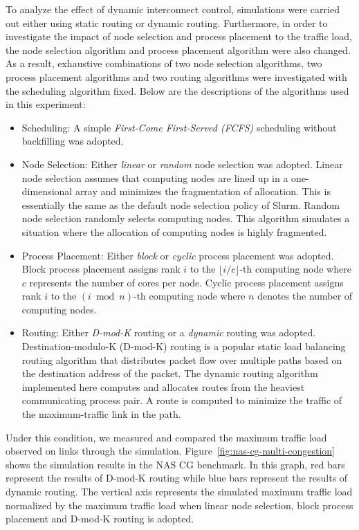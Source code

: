 To analyze the effect of dynamic interconnect control, simulations were
carried out either using static routing or dynamic routing. Furthermore,
in order to investigate the impact of node selection and process
placement to the traffic load, the node selection algorithm and process
placement algorithm were also changed. As a result, exhaustive
combinations of two node selection algorithms, two process placement
algorithms and two routing algorithms were investigated with the
scheduling algorithm fixed. Below are the descriptions of the algorithms
used in this experiment:

\begin{itemize}
\item
  Scheduling: A simple \emph{First-Come First-Served (FCFS)} scheduling
  without backfilling was adopted.
\item
  Node Selection: Either \emph{linear} or \emph{random} node selection
  was adopted. Linear node selection assumes that computing nodes are
  lined up in a one-dimensional array and minimizes the fragmentation of
  allocation. This is essentially the same as the default node selection
  policy of Slurm. Random node selection randomly selects computing
  nodes. This algorithm simulates a situation where the allocation of
  computing nodes is highly fragmented.
\item
  Process Placement: Either \emph{block} or \emph{cyclic} process
  placement was adopted. Block process placement assigns rank \(i\) to
  the \(\lfloor i / c \rfloor\)-th computing node where \(c\) represents
  the number of cores per node. Cyclic process placement assigns rank
  \(i\) to the \((i \bmod n)\)-th computing node where \(n\) denotes the
  number of computing nodes.
\item
  Routing: Either \emph{D-mod-K} routing or a \emph{dynamic} routing was
  adopted. \mbox{Destination-modulo-K} (\mbox{D-mod-K}) routing is a
  popular static load balancing routing algorithm that distributes
  packet flow over multiple paths based on the destination address of
  the packet. The dynamic routing algorithm implemented here computes
  and allocates routes from the heaviest communicating process pair. A
  route is computed to minimize the traffic of the maximum-traffic link
  in the path.
\end{itemize}

Under this condition, we measured and compared the maximum traffic load
observed on links through the simulation.
Figure~\ref{fig:nas-cg-multi-congestion} shows the simulation results in
the NAS CG benchmark. In this graph, red bars represent the results of
\mbox{D-mod-K} routing while blue bars represent the results of dynamic
routing. The vertical axis represents the simulated maximum traffic load
normalized by the maximum traffic load when linear node selection, block
process placement and \mbox{D-mod-K} routing is adopted.

